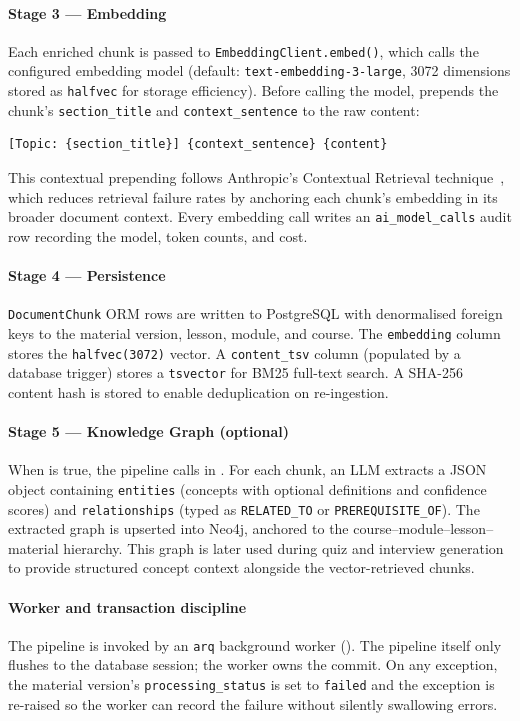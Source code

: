 \paragraph{Stage 3 — Embedding}
Each enriched chunk is passed to \texttt{EmbeddingClient.embed()}, which calls the configured embedding model (default: \texttt{text-embedding-3-large}, 3072 dimensions stored as \texttt{halfvec} for storage efficiency). Before calling the model,  prepends the chunk's \texttt{section\_title} and \texttt{context\_sentence} to the raw content:

\begin{verbatim}
[Topic: {section_title}] {context_sentence} {content}
\end{verbatim}

This contextual prepending follows Anthropic's Contextual Retrieval technique~\cite{anthropic2024contextual}, which reduces retrieval failure rates by anchoring each chunk's embedding in its broader document context. Every embedding call writes an \texttt{ai\_model\_calls} audit row recording the model, token counts, and cost.

\paragraph{Stage 4 — Persistence}
\texttt{DocumentChunk} ORM rows are written to PostgreSQL with denormalised foreign keys to the material version, lesson, module, and course. The \texttt{embedding} column stores the \texttt{halfvec(3072)} vector. A \texttt{content\_tsv} column (populated by a database trigger) stores a \texttt{tsvector} for BM25 full-text search. A SHA-256 content hash is stored to enable deduplication on re-ingestion.

\paragraph{Stage 5 — Knowledge Graph (optional)}
When  is true, the pipeline calls  in . For each chunk, an LLM extracts a JSON object containing \texttt{entities} (concepts with optional definitions and confidence scores) and \texttt{relationships} (typed as \texttt{RELATED\_TO} or \texttt{PREREQUISITE\_OF}). The extracted graph is upserted into Neo4j, anchored to the course–module–lesson–material hierarchy. This graph is later used during quiz and interview generation to provide structured concept context alongside the vector-retrieved chunks.

\paragraph{Worker and transaction discipline}
The pipeline is invoked by an \texttt{arq} background worker (). The pipeline itself only flushes to the database session; the worker owns the commit. On any exception, the material version's \texttt{processing\_status} is set to \texttt{failed} and the exception is re-raised so the worker can record the failure without silently swallowing errors.
